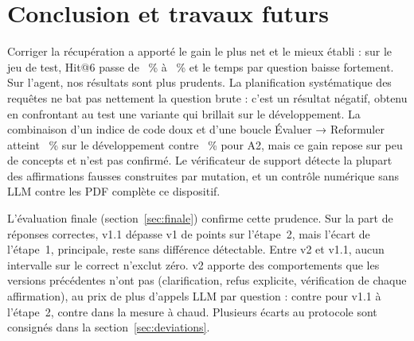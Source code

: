 \section{Conclusion et travaux futurs}

Corriger la récupération a apporté le gain le plus net et le mieux établi : sur le jeu de test, Hit@6 passe de
\NVoneTestHitsix~\% à \NVoneoneTestHitsix~\% et le temps par question baisse fortement. Sur l'agent, nos résultats sont plus
prudents. La planification systématique des requêtes ne bat pas nettement la question brute : c'est un résultat négatif,
obtenu en confrontant au test une variante qui brillait sur le développement. La combinaison d'un indice de code doux et
d'une boucle Évaluer → Reformuler atteint \NLoopLoopGHitsix~\% sur le développement contre \NLoopAtwoHitsix~\% pour A2, mais
ce gain repose sur peu de concepts et n'est pas confirmé. Le vérificateur de support détecte la plupart des affirmations
fausses construites par mutation, et un contrôle numérique sans LLM contre les PDF complète ce dispositif.

L'évaluation finale (section~\ref{sec:finale}) confirme cette prudence. Sur la part de réponses correctes, v1.1 dépasse v1 de
\EvDiffStwoVoneoneVoneCorrect{} points \EvDiffStwoVoneoneVoneCorrectCI{} sur l'étape~2, mais l'écart de l'étape~1, principale, reste sans
différence détectable. Entre v2 et v1.1, aucun intervalle sur le correct n'exclut zéro. v2 apporte des comportements que les versions
précédentes n'ont pas (clarification, refus explicite, vérification de chaque affirmation), au prix de plus d'appels LLM par question :
\EvStwoVtwoCalls{} contre \EvStwoVoneoneCalls{} pour v1.1 à l'étape~2, \EvLatVtwoCalls{} contre \EvLatVoneoneCalls{} dans la mesure à chaud. Plusieurs écarts au protocole sont consignés dans la section~\ref{sec:deviations}.

